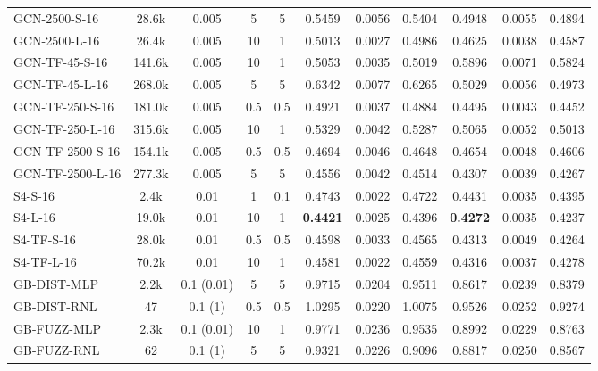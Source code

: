 \begin{table*}[h]
{\begin{tabular}{l c c cc >{\columncolor{gray!20}}ccc >{\columncolor{gray!20}}ccc}
            GCN-2500-S-16 & 28.6k & 0.005 & 5 & 5 & 0.5459 & 0.0056 & 0.5404 & 0.4948 & 0.0055 & 0.4894 \\
            GCN-2500-L-16 & 26.4k & 0.005 & 10 & 1 & 0.5013 & 0.0027 & 0.4986 & 0.4625 & 0.0038 & 0.4587 \\
            \hline
            GCN-TF-45-S-16 & 141.6k & 0.005 & 10 & 1 & 0.5053 & 0.0035 & 0.5019 & 0.5896 & 0.0071 & 0.5824 \\
            GCN-TF-45-L-16 & 268.0k & 0.005 & 5 & 5 & 0.6342 & 0.0077 & 0.6265 & 0.5029 & 0.0056 & 0.4973 \\
            GCN-TF-250-S-16 & 181.0k & 0.005 & 0.5 & 0.5 & 0.4921 & 0.0037 & 0.4884 & 0.4495 & 0.0043 & 0.4452 \\
            GCN-TF-250-L-16 & 315.6k & 0.005 & 10 & 1 & 0.5329 & 0.0042 & 0.5287 & 0.5065 & 0.0052 & 0.5013 \\
            GCN-TF-2500-S-16 & 154.1k & 0.005 & 0.5 & 0.5 & 0.4694 & 0.0046 & 0.4648 & 0.4654 & 0.0048 & 0.4606 \\
            GCN-TF-2500-L-16 & 277.3k & 0.005 & 5 & 5 & 0.4556 & 0.0042 & 0.4514 & 0.4307 & 0.0039 & 0.4267 \\
            \hline
            S4-S-16 & 2.4k & 0.01 & 1 & 0.1 & 0.4743 & 0.0022 & 0.4722 & 0.4431 & 0.0035 & 0.4395 \\
            S4-L-16 & 19.0k & 0.01 & 10 & 1 & \textbf{0.4421} & 0.0025 & 0.4396 & \textbf{0.4272} & 0.0035 & 0.4237 \\
            \hline
            S4-TF-S-16 & 28.0k & 0.01 & 0.5 & 0.5 & 0.4598 & 0.0033 & 0.4565 & 0.4313 & 0.0049 & 0.4264 \\
            S4-TF-L-16 & 70.2k & 0.01 & 10 & 1 & 0.4581 & 0.0022 & 0.4559 & 0.4316 & 0.0037 & 0.4278 \\
            \hline
            GB-DIST-MLP & 2.2k & 0.1 (0.01) & 5 & 5 & 0.9715 & 0.0204 & 0.9511 & 0.8617 & 0.0239 & 0.8379 \\
            GB-DIST-RNL & 47 & 0.1 (1) & 0.5 & 0.5 & 1.0295 & 0.0220 & 1.0075 & 0.9526 & 0.0252 & 0.9274 \\
            \hline
            GB-FUZZ-MLP & 2.3k & 0.1 (0.01) & 10 & 1 & 0.9771 & 0.0236 & 0.9535 & 0.8992 & 0.0229 & 0.8763 \\
            GB-FUZZ-RNL & 62 & 0.1 (1) & 5 & 5 & 0.9321 & 0.0226 & 0.9096 & 0.8817 & 0.0250 & 0.8567 \\
            \hline
            \hline
        \end{tabular}
    }
\end{table*}



